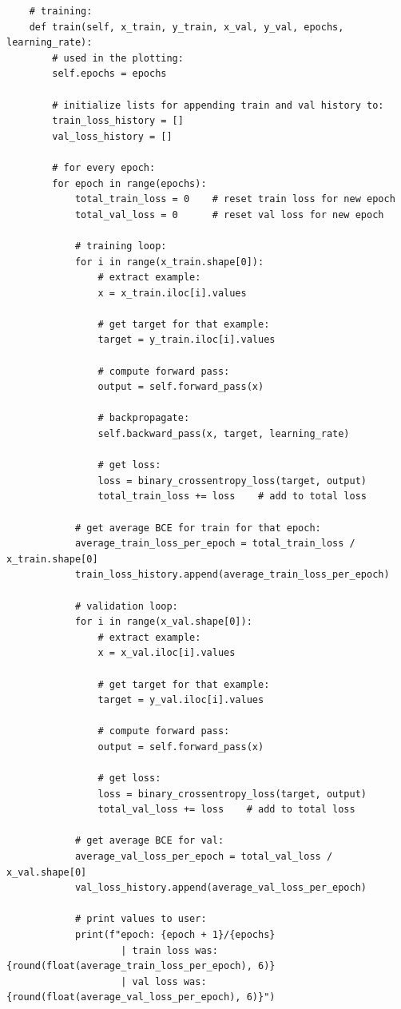 \documentclass[a4paper]{article}
\begin{document}
\begin{lstlisting}
    # training:
    def train(self, x_train, y_train, x_val, y_val, epochs, learning_rate):
        # used in the plotting:
        self.epochs = epochs
        
        # initialize lists for appending train and val history to:
        train_loss_history = []
        val_loss_history = []

        # for every epoch:
        for epoch in range(epochs):
            total_train_loss = 0    # reset train loss for new epoch
            total_val_loss = 0      # reset val loss for new epoch

            # training loop:
            for i in range(x_train.shape[0]):
                # extract example:
                x = x_train.iloc[i].values

                # get target for that example:
                target = y_train.iloc[i].values

                # compute forward pass:
                output = self.forward_pass(x)

                # backpropagate:
                self.backward_pass(x, target, learning_rate)

                # get loss:
                loss = binary_crossentropy_loss(target, output)
                total_train_loss += loss    # add to total loss  

            # get average BCE for train for that epoch:
            average_train_loss_per_epoch = total_train_loss / x_train.shape[0]
            train_loss_history.append(average_train_loss_per_epoch)

            # validation loop:
            for i in range(x_val.shape[0]):
                # extract example:
                x = x_val.iloc[i].values

                # get target for that example:
                target = y_val.iloc[i].values

                # compute forward pass:
                output = self.forward_pass(x)

                # get loss:
                loss = binary_crossentropy_loss(target, output)
                total_val_loss += loss    # add to total loss 
            
            # get average BCE for val:
            average_val_loss_per_epoch = total_val_loss / x_val.shape[0]
            val_loss_history.append(average_val_loss_per_epoch)

            # print values to user:
            print(f"epoch: {epoch + 1}/{epochs} 
                    | train loss was: {round(float(average_train_loss_per_epoch), 6)} 
                    | val loss was: {round(float(average_val_loss_per_epoch), 6)}")  


\end{lstlisting}
\end{document}
